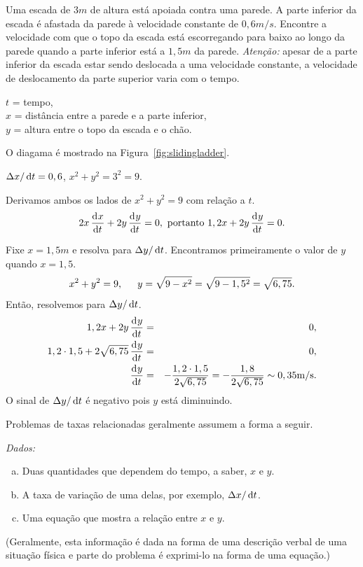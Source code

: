\begin{example}
Uma escada de $3\si{m}$ de altura está apoiada contra uma parede. A parte
inferior da escada é afastada da parede à velocidade constante de
$0,6\si{m/s}$. Encontre a velocidade com que o topo da escada está
escorregando para baixo ao longo da parede quando a parte inferior está
a $1,5\si{m}$ da parede. \emph{Atenção:} apesar de a parte inferior da
escada estar sendo deslocada a uma velocidade constante, a velocidade de
deslocamento da parte superior varia com o tempo.
\begin{stepanalysis}
\item $t$ = tempo,\\
      $x$ = distância entre a parede e a parte inferior,\\
      $y$ = altura entre o topo da escada e o chão.

      O diagama é mostrado na Figura~\ref{fig:slidingladder}.
\item $\dx/\dt = 0,6$, \hspace{1.5em} $x^2 + y^2 = 3^2 = 9$.
\item Derivamos ambos os lados de $x^2 + y^2 = 9$ com relação a $t$.
      $$
        2x \dod x t + 2y \dod y t = 0, \text{ portanto }
          1,2 x + 2y \dod y t = 0.
      $$
\item Fixe $x = 1,5\si{m}$ e resolva para $\dy/\dt$. Encontramos
      primeiramente o valor de $y$ quando $x = 1,5$.
      $$
        x^2 + y^2 = 9, \hspace{1.5em} y = \sqrt{9 - x^2} =
          \sqrt{9 - 1,5^2} = \sqrt{6,75}.
      $$
      Então, resolvemos para $\dy/\dt$.
      \begin{eqnarray*}
        1,2 x + 2 y \dod y t & = & 0, \\
        1,2 \cdot 1,5 + 2 \sqrt{6,75} \dod y t & = & 0, \\
        \dod y t & = & -\frac{1,2 \cdot 1,5}{2 \sqrt{6,75}} =
          - \frac{1,8}{2 \sqrt{6,75}} \sim 0,35\si{m/s}.
      \end{eqnarray*}
      O sinal de $\dy/\dt$ é negativo pois $y$ está diminuindo.
\end{stepanalysis}
\end{example}

Problemas de taxas relacionadas geralmente assumem a forma a seguir.

\emph{Dados:}
\begin{enumerate}[(a)]
\item Duas quantidades que dependem do tempo, a saber, $x$ e $y$.
\item A taxa de variação de uma delas, por exemplo, $\dx/\dt$.
\item Uma equação que mostra a relação entre $x$ e $y$.
\end{enumerate}
(Geralmente, esta informação é dada na forma de uma descrição verbal de
uma situação física e parte do problema é exprimi-lo na forma de uma
equação.)

